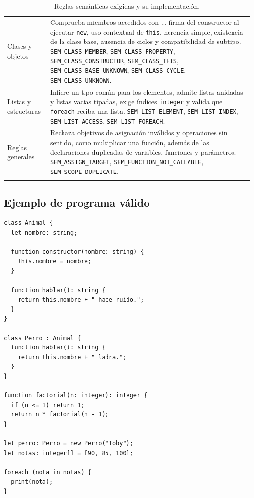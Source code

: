 \documentclass[11pt,a4paper]{article}
\begin{document}
\begin{longtable}{@{}p{3.6cm}L{11.4cm}@{}}
Clases y objetos &
Comprueba miembros accedidos con \texttt{.}, firma del constructor al ejecutar
\texttt{new}, uso contextual de \texttt{this}, herencia simple, existencia de la
clase base, ausencia de ciclos y compatibilidad de subtipo.
\newline
\texttt{SEM\_CLASS\_MEMBER}, \texttt{SEM\_CLASS\_PROPERTY},
\texttt{SEM\_CLASS\_CONSTRUCTOR}, \texttt{SEM\_CLASS\_THIS},
\texttt{SEM\_CLASS\_BASE\_UNKNOWN}, \texttt{SEM\_CLASS\_CYCLE},
\texttt{SEM\_CLASS\_UNKNOWN}. \\
\addlinespace

Listas y estructuras &
Infiere un tipo común para los elementos, admite listas anidadas y listas
vacías tipadas, exige índices \texttt{integer} y valida que \texttt{foreach}
reciba una lista.
\newline
\texttt{SEM\_LIST\_ELEMENT}, \texttt{SEM\_LIST\_INDEX},
\texttt{SEM\_LIST\_ACCESS}, \texttt{SEM\_LIST\_FOREACH}. \\
\addlinespace

Reglas generales &
Rechaza objetivos de asignación inválidos y operaciones sin sentido, como
multiplicar una función, además de las declaraciones duplicadas de variables,
funciones y parámetros.
\newline
\texttt{SEM\_ASSIGN\_TARGET}, \texttt{SEM\_FUNCTION\_NOT\_CALLABLE},
\texttt{SEM\_SCOPE\_DUPLICATE}. \\
\bottomrule
\caption{Reglas semánticas exigidas y su implementación.}
\end{longtable}

\subsection{Ejemplo de programa válido}

\begin{lstlisting}[language=Compiscript,caption={\texttt{bienvenido.cps}: clases, herencia, recursión y listas.}]
class Animal {
  let nombre: string;

  function constructor(nombre: string) {
    this.nombre = nombre;
  }

  function hablar(): string {
    return this.nombre + " hace ruido.";
  }
}

class Perro : Animal {
  function hablar(): string {
    return this.nombre + " ladra.";
  }
}

function factorial(n: integer): integer {
  if (n <= 1) return 1;
  return n * factorial(n - 1);
}

let perro: Perro = new Perro("Toby");
let notas: integer[] = [90, 85, 100];

foreach (nota in notas) {
  print(nota);
}
\end{lstlisting}
\end{document}
